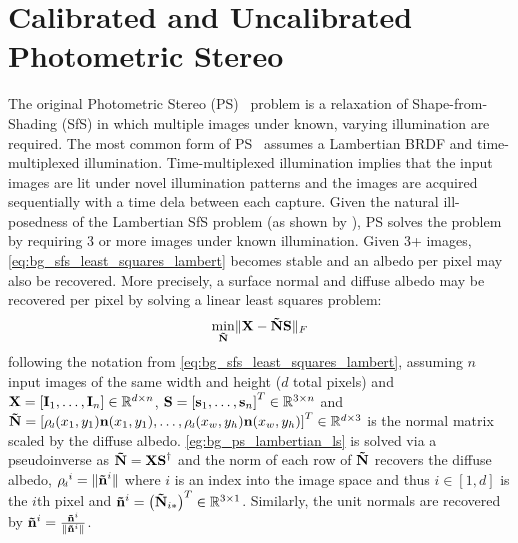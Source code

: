 \section{Calibrated and Uncalibrated Photometric Stereo}\label{sec:bg_ps}
The original Photometric Stereo (PS)~\cite{woodham1980photometric} problem
is a relaxation of Shape-from-Shading (SfS) in which multiple images under
known, varying illumination are required. The most common form of
PS~\cite{woodham1980photometric} assumes a Lambertian BRDF and time-multiplexed
illumination. Time-multiplexed illumination implies that the input images
are lit under novel illumination patterns and the images are acquired
sequentially with a time dela between each capture. Given the natural
ill-posedness of the Lambertian SfS problem (as shown by
), PS solves the problem by requiring
3 or more images under known illumination. Given 3+ images,
\cref{eq:bg_sfs_least_squares_lambert} becomes stable and an albedo per pixel
may also be recovered. More precisely, a surface normal and diffuse albedo
may be recovered per pixel by solving a linear least squares problem:
\begin{equation}\label{eg:bg_ps_lambertian_ls}
	 \min_{\boldsymbol{\mathbf{\tilde{N}}}} \lVert \boldsymbol{\mathbf{X}} - \boldsymbol{\mathbf{\tilde{N}}} \boldsymbol{\mathbf{S}} \rVert_F
\end{equation}
following the notation from \cref{eq:bg_sfs_least_squares_lambert},
assuming $n$ input images of the same width and height ($d$ total pixels) and
$\boldsymbol{\mathbf{X}} = [\boldsymbol{\mathbf{I}}_1, \ldots, \boldsymbol{\mathbf{I}}_n] \in \mathbb{R}^{d \times n}$,
$\boldsymbol{\mathbf{S}} = {[\boldsymbol{\mathbf{s}}_1, \ldots, \boldsymbol{\mathbf{s}}_n]}^T \in \mathbb{R}^{3 \times n}$ and
$\bb{\tilde{N}} = {[\rho_{\smallsub{d}}(x_1, y_1)\bb{n}(x_1, y_1), \ldots, \rho_{\smallsub{d}}(x_w, y_h)\bb{n}(x_w, y_h)]}^T \in \R^{d \times 3}$
is the normal matrix scaled by the diffuse
albedo. \cref{eg:bg_ps_lambertian_ls} is solved via a
pseudoinverse as $\boldsymbol{\mathbf{\tilde{N}}} = \boldsymbol{\mathbf{X}} \boldsymbol{\mathbf{S}}^{\dagger}$ and the norm of each
row of $\boldsymbol{\mathbf{\tilde{N}}}$ recovers the diffuse albedo,
${\rho_{\smallsub{d}}}^i = \norm{\bb{\tilde{n}}^i}$
where $i$ is an index into the image space and thus $i \in [1, d]$
is the $i$th pixel and
$\boldsymbol{\mathbf{\tilde{n}}}^i = {\left(\boldsymbol{\mathbf{\tilde{N}}}_{i\ast}\right)}^T \in \mathbb{R}^{3 \times 1}$.
Similarly, the unit normals are recovered by
$\boldsymbol{\mathbf{\tilde{n}}}^i = \frac{\boldsymbol{\mathbf{\tilde{n}}}^i}{\lVert{} \boldsymbol{\mathbf{\tilde{n}}}^i \rVert}$.
